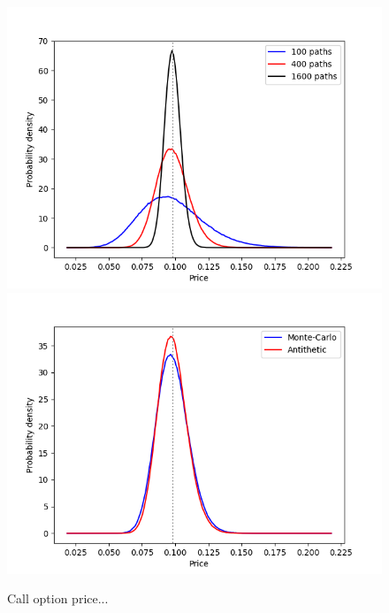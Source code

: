 \begin{figure}
\centering
\includegraphics[scale=0.7]{figures/hw_1f_call_option/density_2d_Call_False.png}
\includegraphics[scale=0.7]{figures/hw_1f_call_option/density_2d_Call_400.png}
\caption{Call option price...}
\end{figure}


